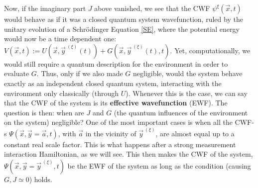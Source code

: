\documentclass[11pt, a4paper]{article} %
\begin{document}
Now, if the imaginary part $J$ above vanished, we see that the CWF $\psi^\xi(\vec{x},t)$ would behave as if it was a closed quantum system wavefunction, ruled by the unitary evolution of a Schrödinger Equation \eqref{SE}, where the potential energy would now be a time dependent one: $V(\vec{x},t):=U(\vec{x},\vec{y}^{\:(\xi)}(t))+G(\vec{x},\vec{y}^{\:(\xi)}(t),t)$. Yet, computationally, we would still require a quantum description for the environment in order to evaluate $G$. Thus, only if we also made $G$ negligible, would the system behave exactly as an independent closed quantum system, interacting with the environment only classically (through $U$). Whenever this is the case, we can say that the CWF of the system is its {\bf effective wavefunction} (EWF). The question is then: when are $J$ and $G$ (the quantum influences of the environment on the system) negligible? One of the most important cases is when all the CWF-s $\Psi(\vec{x},\vec{y}=\vec{a},t)$, with $\vec{a}$ in the vicinity of $\vec{y}^{\: (\xi)}$, are almost equal up to a constant real scale factor. This is what happens after a strong measurement interaction Hamiltonian, as we will see. This then makes the CWF of the system, $\Psi(\vec{x},\vec{y}=\vec{y}^{\: (\xi)},t)$ be the EWF of the system as long as the condition (causing $G,J\simeq 0$) holds. 



\vspace{-0.2cm}
\end{document}
